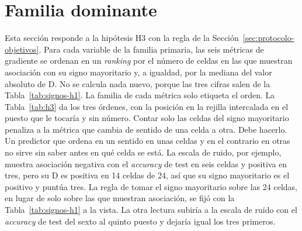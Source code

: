 \section{Familia dominante}
\label{sec:res-familia}

Esta sección responde a la hipótesis H3 con la regla de la Sección~\ref{sec:protocolo-objetivos}. Para cada variable de la familia primaria, las seis métricas de gradiente se ordenan en un \emph{ranking} por el número de celdas en las que muestran asociación con su signo mayoritario y, a igualdad, por la mediana del valor absoluto de D. No se calcula nada nuevo, porque las tres cifras salen de la Tabla~\ref{tab:signos-h1}. La familia de cada métrica solo etiqueta el orden. La Tabla~\ref{tab:h3} da los tres órdenes, con la posición en la rejilla intercalada en el puesto que le tocaría y sin número. Contar solo las celdas del signo mayoritario penaliza a la métrica que cambia de sentido de una celda a otra. Debe hacerlo. Un predictor que ordena en un sentido en unas celdas y en el contrario en otras no sirve sin saber antes en qué celda se está. La escala de ruido, por ejemplo, muestra asociación negativa con el \emph{accuracy} de test en seis celdas y positiva en tres, pero su D es positiva en 14 celdas de 24, así que su signo mayoritario es el positivo y puntúa tres. La regla de tomar el signo mayoritario sobre las 24 celdas, en lugar de solo sobre las que muestran asociación, se fijó con la Tabla~\ref{tab:signos-h1} a la vista. La otra lectura subiría a la escala de ruido con el \emph{accuracy} de test del sexto al quinto puesto y dejaría igual los tres primeros.

